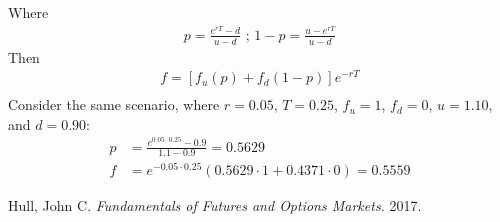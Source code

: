 \documentclass[12pt]{article}
\begin{document}
Where
\begin{align*}
p=\frac{e^{rT}-d}{u-d} \text{ ; }
1-p=\frac{u-e^{rT}}{u-d}
\end{align*}
Then
\begin{align*}
f=[f_{u}(p)+f_{d}(1-p)]e^{-rT}\\
\end{align*}
Consider the same scenario, where $r=0.05$, $T=0.25$, $f_{u}=1$, $f_{d}=0$, $u=1.10$, and $d=0.90$:\\
\begin{align*}
p&=\frac{e^{0.05\cdot0.25}-0.9}{1.1-0.9}=0.5629\\
f&=e^{-0.05\cdot0.25}(0.5629\cdot1+0.4371\cdot0)=0.5559
\end{align*}

\newpage
\begin{thebibliography}{1}
\bibitem{} Hull, John C. {\em Fundamentals of Futures and Options Markets.} 2017.
\end{thebibliography}
\end{document}
